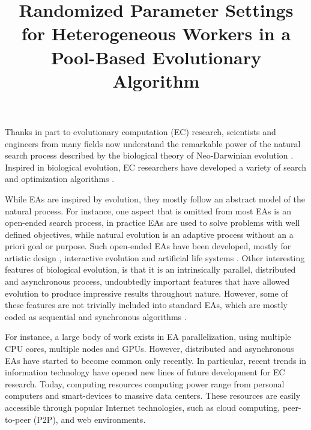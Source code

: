 \documentclass{llncs}
\begin{document}
\title{ Randomized Parameter Settings for Heterogeneous Workers in a Pool-Based Evolutionary Algorithm}

\maketitle              %


Thanks in part  to evolutionary computation (EC) research, scientists and engineers from many fields now understand the remarkable power of
the natural search process described by the biological theory of Neo-Darwinian evolution \cite{holland}. 
Inspired in biological evolution, EC researchers have developed a variety of search and optimization algorithms \cite{eiben}.

While EAs are inspired by evolution, they mostly follow an abstract model of the natural process.
For instance, one aspect that is omitted from most EAs is an open-ended search process,
in practice EAs are used to solve problems with well defined objectives, while natural evolution is an adaptive process without an a priori goal or purpose.
Such open-ended EAs have been developed, mostly for artistic design \cite{Musart}, interactive evolution \cite{ie1} and artificial life systems \cite{avida}.
Other interesting features of biological evolution, is that it is an intrinsically parallel, distributed and asynchronous process,
undoubtedly important features that have allowed evolution to produce impressive results throughout nature.
However, some of these features are not trivially included into standard EAs,
which are mostly coded as sequential and synchronous algorithms \cite{eiben}.

For instance, a large body of work exists in EA parallelization, using multiple CPU cores, multiple nodes and GPUs.
However, distributed and asynchronous EAs have started to become common only recently.
In particular, recent trends in information technology have opened new lines of future development for EC research.
Today, computing resources computing power range from personal computers and smart-devices to massive data centers.
These resources are easily accessible through popular Internet technologies, such as cloud computing, 
peer-to-peer (P2P), and web environments.
\end{document}
